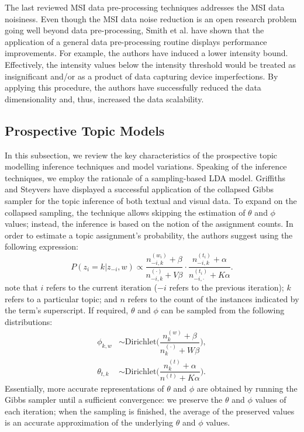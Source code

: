 \documentclass{mpaper}
\begin{document}
\par The last reviewed MSI data pre-processing techniques addresses the MSI data noisiness. Even though the MSI data noise reduction is an open research problem going well beyond data pre-processing, Smith et al. \cite{smith2014proteomics} have shown that the application of a general data pre-processing routine displays performance improvements. For example, the authors have induced a lower intensity bound. Effectively, the intensity values below the intensity threshold would be treated as insignificant and/or as a product of data capturing device imperfections. By applying this procedure, the authors have successfully reduced the data dimensionality and, thus, increased the data scalability.

\subsection{Prospective Topic Models}

\par In this subsection, we review the key characteristics of the prospective topic modelling inference techniques and model variations. Speaking of the inference techniques, we employ the rationale of a sampling-based LDA model. Griffiths and Steyvers \cite{griffiths2004finding} have displayed a successful application of the collapsed Gibbs sampler for the topic inference of both textual and visual data. To expand on the collapsed sampling, the technique allows skipping the estimation of $\theta$ and $\phi$ values; instead, the inference is based on the notion of the assignment counts. In order to estimate a topic assignment's probability, the authors suggest using the following expression:
\begin{equation*}
P(z_i = k | z_{-i}, w) \propto \dfrac{n_{-i, k}^{(w_i)} + \beta}{n_{-i, k}^{(\cdot)} + V\beta}\cdot \dfrac{n_{-i, k}^{(t_i)} + \alpha}{n_{-i, \cdot}^{(t_i)} + K\alpha}.
\end{equation*}
note that $i$ refers to the current iteration ($-i$ refers to the previous iteration); $k$ refers to a particular topic; and $n$ refers to the count of the instances indicated by the term's superscript. If required, $\theta$ and $\phi$ can be sampled from the following distributions:
\begin{align*}
\phi_{k,w} & \sim \mbox{Dirichlet}\bigg(\dfrac{n_{k}^{(w)} + \beta}{n_{k}^{(\cdot)} + W\beta}\bigg),\\
\theta_{t,k} & \sim \mbox{Dirichlet}\bigg(\dfrac{n_{k}^{(t)} + \alpha}{n^{(t)} + K\alpha}\bigg).
\end{align*}
Essentially, more accurate representations of $\theta$ and $\phi$ are obtained by running the Gibbs sampler until a sufficient convergence: we preserve the $\theta$ and $\phi$ values of each iteration; when the sampling is finished, the average of the preserved values is an accurate approximation of the underlying $\theta$ and $\phi$ values.
\end{document}
